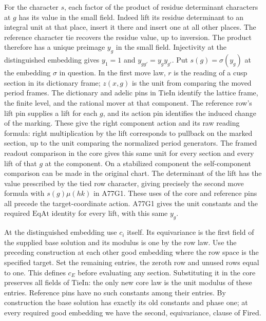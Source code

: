 For the character $s$, each factor of the product of residue
determinant characters at $g$ has its value in the small field.
Indeed lift its residue determinant to an integral unit at that
place, insert it there and insert one at all other places. The
reference character tie recovers the residue value, up to inversion.
The product therefore has a unique preimage $y_g$ in the small
field. Injectivity at the distinguished embedding gives
$y_1=1$ and $y_{gg'}=y_g y_{g'}$. Put $s(g)=\sigma(y_g)$ at
the embedding $\sigma$ in question. In the first move law,
$r$ is the reading of a cusp section in its dictionary frame;
$z(x,g)$ is the unit from comparing the moved period frames.
The dictionary and adelic pins in $\mathrm{TieIn}$ identify the
lattice frame, the finite level, and the rational mover at that
component. The reference row's lift pin supplies a lift for each $g$,
and its action pin identifies the induced change of the marking.
These give the right component action and its raw reading formula:
right multiplication by the lift corresponds to pullback on the
marked section, up to the unit comparing the normalized period
generators. The framed readout comparison in the core gives this
same unit for every section and every lift of that $g$ at the
component. On a stabilized component the self-component comparison
can be made in the original chart. The determinant of the lift has
the value prescribed by the tied row character, giving precisely
the second move formula with $s(g)\mu(hk)$ in A77G1. These uses of
the core and reference pins all precede the target-coordinate action. A77G1 gives
the unit constants and the required $\mathrm{EqAt}$ identity
for every lift, with this same $y_g$.

At the distinguished embedding use $c_i$ itself. Its equivariance
is the first field of the supplied base solution and its modulus
is one by the row law. Use the preceding construction at each
other good embedding where the row space is the specified target.
Set the remaining entries, the zeroth row and unused rows equal
to one. This defines $c_E$ before evaluating any section. Substituting
it in the core preserves all fields of $\mathrm{TieIn}$: the only
new core law is the unit modulus of these entries. Reference pins
have no such constants among their entries. By construction the
base solution has exactly its old constants and phase one; at
every required good embedding we have the second, equivariance,
clause of $\mathrm{Fired}$.

